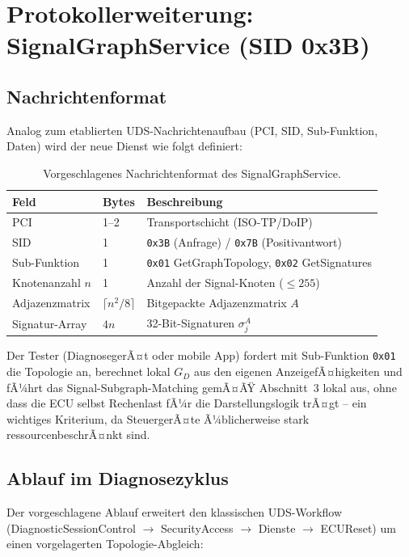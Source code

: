 ﻿\documentclass[a4paper,12pt]{article}
\theoremstyle{definition}
\begin{document}
\section{Protokollerweiterung: SignalGraphService (SID 0x3B)}

\subsection{Nachrichtenformat}

Analog zum etablierten UDS-Nachrichtenaufbau (PCI, SID, Sub-Funktion, Daten) wird der neue Dienst wie folgt definiert:

\begin{table}[h]
\centering
\small
\begin{tabular}{@{}lll@{}}
\toprule
Feld & Bytes & Beschreibung \\
\midrule
PCI & 1--2 & Transportschicht (ISO-TP/DoIP) \\
SID & 1 & \texttt{0x3B} (Anfrage) / \texttt{0x7B} (Positivantwort) \\
Sub-Funktion & 1 & \texttt{0x01} GetGraphTopology, \texttt{0x02} GetSignatures \\
Knotenanzahl $n$ & 1 & Anzahl der Signal-Knoten ($\leq 255$) \\
Adjazenzmatrix & $\lceil n^2/8 \rceil$ & Bitgepackte Adjazenzmatrix $A$ \\
Signatur-Array & $4n$ & 32-Bit-Signaturen $\sigma_j^A$ \\
\bottomrule
\end{tabular}
\caption{Vorgeschlagenes Nachrichtenformat des SignalGraphService.}
\label{tab:format}
\end{table}

Der Tester (DiagnosegerÃ¤t oder mobile App) fordert mit Sub-Funktion \texttt{0x01} die Topologie an, berechnet lokal $G_D$ aus den eigenen AnzeigefÃ¤higkeiten und fÃ¼hrt das Signal-Subgraph-Matching gemÃ¤ÃŸ Abschnitt~3 lokal aus, ohne dass die ECU selbst Rechenlast fÃ¼r die Darstellungslogik trÃ¤gt -- ein wichtiges Kriterium, da SteuergerÃ¤te Ã¼blicherweise stark ressourcenbeschrÃ¤nkt sind.

\subsection{Ablauf im Diagnosezyklus}

Der vorgeschlagene Ablauf erweitert den klassischen UDS-Workflow (DiagnosticSessionControl $\to$ SecurityAccess $\to$ Dienste $\to$ ECUReset) um einen vorgelagerten Topologie-Abgleich:
\end{document}
